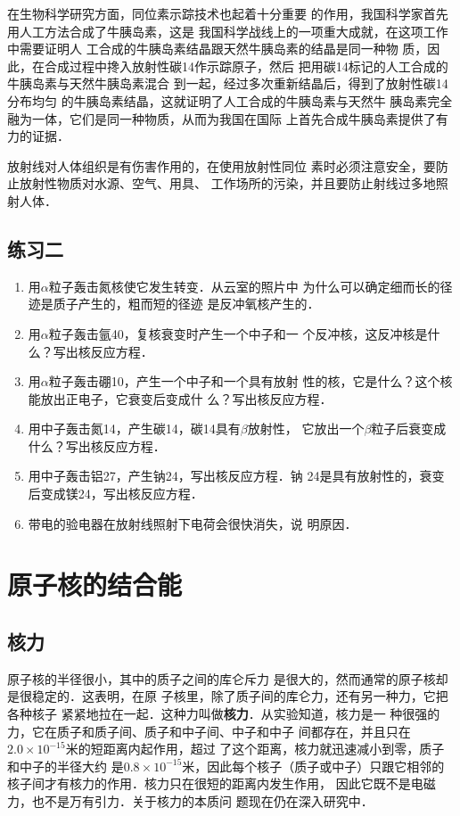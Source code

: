 在生物科学研究方面，同位素示踪技术也起着十分重要
的作用，我国科学家首先用人工方法合成了牛胰岛素，这是
我国科学战线上的一项重大成就，在这项工作中需要证明人
工合成的牛胰岛素结晶跟天然牛胰岛素的结晶是同一种物
质，因此，在合成过程中搀入放射性碳14作示踪原子，然后
把用碳14标记的人工合成的牛胰岛素与天然牛胰岛素混合
到一起，经过多次重新结晶后，得到了放射性碳14分布均匀
的牛胰岛素结晶，这就证明了人工合成的牛胰岛素与天然牛
胰岛素完全融为一体，它们是同一种物质，从而为我国在国际
上首先合成牛胰岛素提供了有力的证据．

放射线对人体组织是有伤害作用的，在使用放射性同位
素时必须注意安全，要防止放射性物质对水源、空气、用具、
工作场所的污染，并且要防止射线过多地照射人体．


\subsection*{练习二}

\begin{enumerate}
    \item 用$\alpha$粒子轰击氮核使它发生转变．从云室的照片中
    为什么可以确定细而长的径迹是质子产生的，粗而短的径迹
    是反冲氧核产生的．
    \item 用$\alpha$粒子轰击氩40，复核衰变时产生一个中子和一
    个反冲核，这反冲核是什么？写出核反应方程．
    \item 用$\alpha$粒子轰击硼10，产生一个中子和一个具有放射
    性的核，它是什么？这个核能放出正电子，它衰变后变成什
    么？写出核反应方程．
    \item 用中子轰击氮14，产生碳14，碳14具有$\beta$放射性，
    它放出一个$\beta$粒子后衰变成什么？写出核反应方程．
    \item 用中子轰击铝27，产生钠24，写出核反应方程．钠
    24是具有放射性的，衰变后变成镁24，写出核反应方程．
    \item 带电的验电器在放射线照射下电荷会很快消失，说
    明原因．
\end{enumerate}


\section{原子核的结合能}
\subsection{核力} 

原子核的半径很小，其中的质子之间的库仑斥力
是很大的，然而通常的原子核却是很稳定的．这表明，在原
子核里，除了质子间的库仑力，还有另一种力，它把各种核子
紧紧地拉在一起．这种力叫做\textbf{核力}．从实验知道，核力是一
种很强的力，它在质子和质子间、质子和中子间、中子和中子
间都存在，并且只在$2.0\times10^{-15}$米的短距离内起作用，超过
了这个距离，核力就迅速减小到零，质子和中子的半径大约
是$0.8\times10^{-15}$米，因此每个核子（质子或中子）只跟它相邻的
核子间才有核力的作用．核力只在很短的距离内发生作用，
因此它既不是电磁力，也不是万有引力．关于核力的本质问
题现在仍在深入研究中．

